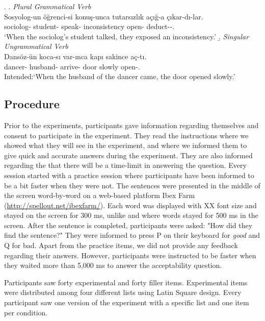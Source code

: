 \documentclass[a4paper,man,natbib]{apa6}\usepackage[]{graphicx}\usepackage[]{color}
\begin{document}
\ex. \label{item:exp1FillerItems}
\a. \textit{Plural Grammatical Verb}\\ 
\gll Sosyolog-un öğrenci-si konuş-unca tutarsızlık açığ-a çıkar-dı-lar.\\ 
sociolog-\Gen{}  student-\Poss{} speak-\Nmlz{} inconsistency  open-\Dat{} deduct-\Pst{}-\Pl{}.\\
\glt `When the sociolog's student talked, they exposed an inconsistency.' 
\b. \textit{Singular Ungrammatical Verb}\\ 
\gll *Dansöz-ün koca-sı var-ınca kapı sakince aç-tı.\\ 
dancer-\Gen{}  husband-\Poss{} arrive-\Nmlz{} door slowly  open-\Pst{}.\\
\glt Intended:`When the husband of the dancer came, the door opened slowly.'

\subsection{Procedure} \label{sec:exp1:procedure}

Prior to the experiments, participants gave information regarding themselves and consent to participate in the experiment. They read the instructions where we showed what they will see in the experiment, and where we informed them to give quick and accurate answers during the experiment. They are also informed regarding the that there will be a time-limit in answering the question. Every session started with a practice session where participants have been informed to be a bit faster when they were not. The sentences were presented in the middle of the screen word-by-word on a web-based platform Ibex Farm (\url{http://spellout.net/ibexfarm/}). Each word was displayed with XX font size and stayed on the screen for 300 ms, unlike \citet{LagoEtAl:2018} and \citet{WagersEtAl:2009} where words stayed for 500 ms in the screen. After the sentence is completed, participants were asked: "How did they find the sentence?" They were informed to press P on their keyboard for \textit{good} and Q for bad. Apart from the practice items, we did not provide any feedback regarding their answers. However, participants were instructed to be faster when they waited more than 5,000 ms to answer the acceptability question. 

Participants saw forty experimental and forty filler items. Experimental items were distributed among four different lists using Latin Square design. Every participant saw one version of the experiment with a specific list and one item per condition.   
\end{document}
